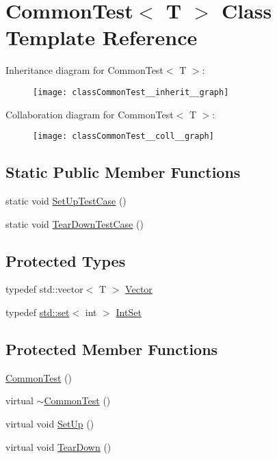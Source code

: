 \hypertarget{classCommonTest}{}\section{Common\+Test$<$ T $>$ Class Template Reference}
\label{classCommonTest}


Inheritance diagram for Common\+Test$<$ T $>$\+:\nopagebreak
\begin{figure}[H]
\begin{center}
\leavevmode
\texttt{[image: classCommonTest\_\_inherit\_\_graph]}
\end{center}
\end{figure}


Collaboration diagram for Common\+Test$<$ T $>$\+:\nopagebreak
\begin{figure}[H]
\begin{center}
\leavevmode
\texttt{[image: classCommonTest\_\_coll\_\_graph]}
\end{center}
\end{figure}
\subsection*{Static Public Member Functions}
\begin{DoxyCompactItemize}
\item 
static void \hyperlink{classCommonTest_a6edd90f32f45cc49e4a423b22bd770ce}{Set\+Up\+Test\+Case} ()
\item 
static void \hyperlink{classCommonTest_a68d2bf5108cf28478331588fbdff4838}{Tear\+Down\+Test\+Case} ()
\end{DoxyCompactItemize}
\subsection*{Protected Types}
\begin{DoxyCompactItemize}
\item 
typedef std\+::vector$<$ T $>$ \hyperlink{classCommonTest_a6dfdcede6964887b9f4254a0e0478e37}{Vector}
\item 
typedef \hyperlink{vendor_2googletest_2googlemock_2CMakeLists_8txt_aa99cc432a5064db15e7653de9d85d2d2}{std\+::set}$<$ int $>$ \hyperlink{classCommonTest_a62827e9d3064cddf4a8698747f1bd434}{Int\+Set}
\end{DoxyCompactItemize}
\subsection*{Protected Member Functions}
\begin{DoxyCompactItemize}
\item 
\hyperlink{classCommonTest_abd5ec205d90f4b81efab2a6f972f3db0}{Common\+Test} ()
\item 
virtual \hyperlink{classCommonTest_a675a632fcf7b1fd961fefc619d6a458d}{$\sim$\+Common\+Test} ()
\item 
virtual void \hyperlink{classCommonTest_a4c7bf7889ce48a9d06530bc4a437f3f5}{Set\+Up} ()
\item 
virtual void \hyperlink{classCommonTest_aeae195c2cefa956c6ae5be1226e6ecd8}{Tear\+Down} ()
\end{DoxyCompactItemize}
